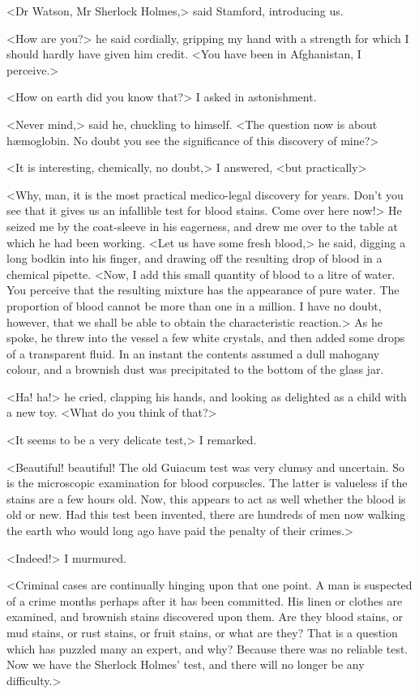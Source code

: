 <Dr Watson, Mr Sherlock Holmes,> said Stamford, introducing us.

<How are you?> he said cordially, gripping my hand with a strength for which I should hardly have given him credit. <You have been in Afghanistan, I perceive.>

<How on earth did you know that?> I asked in astonishment.

<Never mind,> said he, chuckling to himself. <The question now is about hæmoglobin. No doubt you see the significance of this discovery of mine?>

<It is interesting, chemically, no doubt,> I answered, <but practically\longdash>

<Why, man, it is the most practical medico-legal discovery for years. Don't you see that it gives us an infallible test for blood stains. Come over here now!> He seized me by the coat-sleeve in his eagerness, and drew me over to the table at which he had been working. <Let us have some fresh blood,> he said, digging a long bodkin into his finger, and drawing off the resulting drop of blood in a chemical pipette. <Now, I add this small quantity of blood to a litre of water. You perceive that the resulting mixture has the appearance of pure water. The proportion of blood cannot be more than one in a million. I have no doubt, however, that we shall be able to obtain the characteristic reaction.> As he spoke, he threw into the vessel a few white crystals, and then added some drops of a transparent fluid. In an instant the contents assumed a dull mahogany colour, and a brownish dust was precipitated to the bottom of the glass jar.

<Ha! ha!> he cried, clapping his hands, and looking as delighted as a child with a new toy. <What do you think of that?>

<It seems to be a very delicate test,> I remarked.

<Beautiful! beautiful! The old Guiacum test was very clumsy and uncertain. So is the microscopic examination for blood corpuscles. The latter is valueless if the stains are a few hours old. Now, this appears to act as well whether the blood is old or new. Had this test been invented, there are hundreds of men now walking the earth who would long ago have paid the penalty of their crimes.>

<Indeed!> I murmured.

<Criminal cases are continually hinging upon that one point. A man is suspected of a crime months perhaps after it has been committed. His linen or clothes are examined, and brownish stains discovered upon them. Are they blood stains, or mud stains, or rust stains, or fruit stains, or what are they? That is a question which has puzzled many an expert, and why? Because there was no reliable test. Now we have the Sherlock Holmes' test, and there will no longer be any difficulty.>

